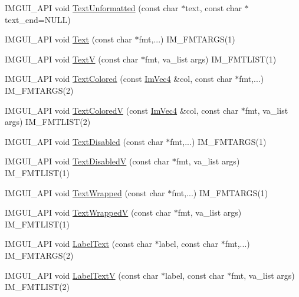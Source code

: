 \begin{DoxyCompactItemize}
\item 
I\+M\+G\+U\+I\+\_\+\+A\+PI void \hyperlink{namespace_im_gui_a96a5f42789ecc419b2ae8af7b2acc28e}{Text\+Unformatted} (const char $\ast$text, const char $\ast$text\+\_\+end=N\+U\+LL)
\item 
I\+M\+G\+U\+I\+\_\+\+A\+PI void \hyperlink{namespace_im_gui_a9e7b83611fe441d54fad2effb4bf4965}{Text} (const char $\ast$fmt,...) I\+M\+\_\+\+F\+M\+T\+A\+R\+GS(1)
\item 
I\+M\+G\+U\+I\+\_\+\+A\+PI void \hyperlink{namespace_im_gui_a10a0d6362178c2f743092f21e1b6cd20}{TextV} (const char $\ast$fmt, va\+\_\+list args) I\+M\+\_\+\+F\+M\+T\+L\+I\+ST(1)
\item 
I\+M\+G\+U\+I\+\_\+\+A\+PI void \hyperlink{namespace_im_gui_a36ab8fcad68b26863d6e910755de04c2}{Text\+Colored} (const \hyperlink{struct_im_vec4}{Im\+Vec4} \&col, const char $\ast$fmt,...) I\+M\+\_\+\+F\+M\+T\+A\+R\+GS(2)
\item 
I\+M\+G\+U\+I\+\_\+\+A\+PI void \hyperlink{namespace_im_gui_a87c24ece994188a7145d8feecb4439ed}{Text\+ColoredV} (const \hyperlink{struct_im_vec4}{Im\+Vec4} \&col, const char $\ast$fmt, va\+\_\+list args) I\+M\+\_\+\+F\+M\+T\+L\+I\+ST(2)
\item 
I\+M\+G\+U\+I\+\_\+\+A\+PI void \hyperlink{namespace_im_gui_aa96bf14c5fa288e106820aeb4ba7fcb6}{Text\+Disabled} (const char $\ast$fmt,...) I\+M\+\_\+\+F\+M\+T\+A\+R\+GS(1)
\item 
I\+M\+G\+U\+I\+\_\+\+A\+PI void \hyperlink{namespace_im_gui_a5b128d4f12d7e33e95fb9cef7dce027e}{Text\+DisabledV} (const char $\ast$fmt, va\+\_\+list args) I\+M\+\_\+\+F\+M\+T\+L\+I\+ST(1)
\item 
I\+M\+G\+U\+I\+\_\+\+A\+PI void \hyperlink{namespace_im_gui_ad57bb15c599e73b2ccc7c0f7de6e5823}{Text\+Wrapped} (const char $\ast$fmt,...) I\+M\+\_\+\+F\+M\+T\+A\+R\+GS(1)
\item 
I\+M\+G\+U\+I\+\_\+\+A\+PI void \hyperlink{namespace_im_gui_a9019a388cd0c410bcb3d3ae63a008123}{Text\+WrappedV} (const char $\ast$fmt, va\+\_\+list args) I\+M\+\_\+\+F\+M\+T\+L\+I\+ST(1)
\item 
I\+M\+G\+U\+I\+\_\+\+A\+PI void \hyperlink{namespace_im_gui_ad92ccfbc33d448ff40cfcf9219177344}{Label\+Text} (const char $\ast$label, const char $\ast$fmt,...) I\+M\+\_\+\+F\+M\+T\+A\+R\+GS(2)
\item 
I\+M\+G\+U\+I\+\_\+\+A\+PI void \hyperlink{namespace_im_gui_a55e5a7edb676a8f5cd7f65443138a8a0}{Label\+TextV} (const char $\ast$label, const char $\ast$fmt, va\+\_\+list args) I\+M\+\_\+\+F\+M\+T\+L\+I\+ST(2)

\end{DoxyCompactItemize}
